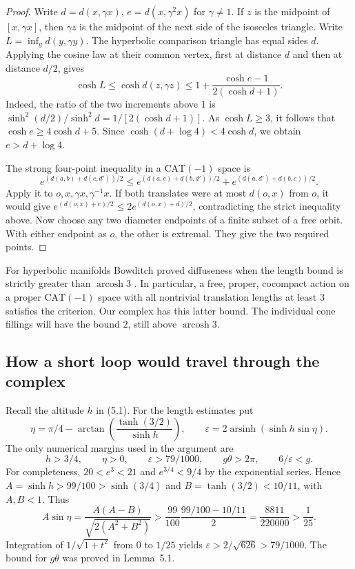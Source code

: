 \documentclass[11pt,a4paper]{article}
\numberwithin{equation}{section}
\begin{document}
\begin{proof}
Write \(d=d(x,\gamma x)\), \(e=d(x,\gamma^2 x)\) for \(\gamma\ne1\). If \(z\) is the midpoint of \([x,\gamma x]\), then \(\gamma z\) is the midpoint of the next side of the isosceles triangle. Write \(L=\inf_y d(y,\gamma y)\). The hyperbolic comparison triangle has equal sides \(d\). Applying the cosine law at their common vertex, first at distance \(d\) and then at distance \(d/2\), gives
\[
 \cosh L\le\cosh d(z,\gamma z)\le1+\frac{\cosh e-1}{2(\cosh d+1)}.
\]
Indeed, the ratio of the two increments above \(1\) is \(\sinh^2(d/2)/\sinh^2d=1/[2(\cosh d+1)]\). As \(\cosh L\ge3\), it follows that \(\cosh e\ge4\cosh d+5\). Since \(\cosh(d+\log 4)<4\cosh d\), we obtain \(e>d+\log 4\).

The strong four-point inequality in a \(\mathrm{CAT}(-1)\) space \cite[Definition~4.1 and Theorem~5.1]{r19} is
\begin{equation}
 e^{(d(a,b)+d(c,d'))/2}\le e^{(d(a,c)+d(b,d'))/2}+e^{(d(a,d')+d(b,c))/2}.
\end{equation}
Apply it to \(o,x,\gamma x,\gamma^{-1}x\). If both translates were at most \(d(o,x)\) from \(o\), it would give \(e^{(d(o,x)+e)/2}\le2e^{(d(o,x)+d)/2}\), contradicting the strict inequality above. Now choose any two diameter endpoints of a finite subset of a free orbit. With either endpoint as \(o\), the other is extremal. They give the two required points.
\end{proof}

For hyperbolic manifolds Bowditch proved diffuseness when the length bound is strictly greater than \(\operatorname{arcosh}3\) \cite[Theorem~5.3 and Lemma~5.4]{r6}. In particular, a free, proper, cocompact action on a proper \(\mathrm{CAT}(-1)\) space with all nontrivial translation lengths at least \(3\) satisfies the criterion. Our complex has this latter bound. The individual cone fillings will have the bound \(2\), still above \(\operatorname{arcosh}3\).

\subsection{How a short loop would travel through the complex}

Recall the altitude \(h\) in (5.1). For the length estimates put
\begin{equation}
 \eta=\pi/4-\arctan\!\left(\frac{\tanh(3/2)}{\sinh h}\right),\qquad
 \varepsilon=2\operatorname{arsinh}(\sinh h\sin\eta).
\end{equation}
The only numerical margins used in the argument are
\begin{equation}
 h>3/4,\qquad \eta>0,\qquad \varepsilon>79/1000,\qquad
 g\theta>2\pi,\qquad 6/\varepsilon<g .
\end{equation}
For completeness, \(20<e^3<21\) and \(e^{3/4}<9/4\) by the exponential series. Hence \(A=\sinh h>99/100>\sinh(3/4)\) and \(B=\tanh(3/2)<10/11\), with \(A,B<1\). Thus
\[
 A\sin\eta=\frac{A(A-B)}{\sqrt{2(A^2+B^2)}}
 >\frac{99}{100}\frac{99/100-10/11}{2}=\frac{8811}{220000}>\frac{1}{25}.
\]
Integration of \(1/\sqrt{1+t^2}\) from \(0\) to \(1/25\) yields \(\varepsilon>2/\sqrt{626}>79/1000\). The bound for \(g\theta\) was proved in Lemma~5.1.
\end{document}
